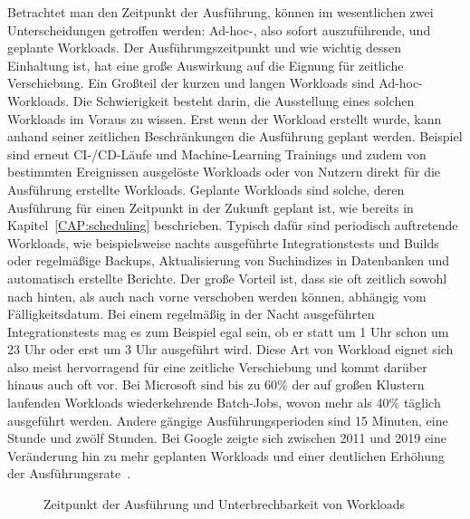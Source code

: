 Betrachtet man den Zeitpunkt der Ausführung, können im wesentlichen zwei Unterscheidungen getroffen werden:
Ad-hoc-, also sofort auszuführende, und geplante Workloads.
Der Ausführungszeitpunkt und wie wichtig dessen Einhaltung ist, hat eine große Auswirkung auf die Eignung für zeitliche Verschiebung.
Ein Großteil der kurzen und langen Workloads sind Ad-hoc-Workloads.
Die Schwierigkeit besteht darin, die Ausstellung eines solchen Workloads im Voraus zu wissen.
Erst wenn der Workload erstellt wurde, kann anhand seiner zeitlichen Beschränkungen die Ausführung geplant werden.
Beispiel sind erneut CI-/CD-Läufe und Machine-Learning Trainings und zudem von bestimmten Ereignissen ausgelöste Workloads oder von Nutzern direkt für die Ausführung erstellte Workloads.
Geplante Workloads sind solche, deren Ausführung für einen Zeitpunkt in der Zukunft geplant ist, wie bereits in Kapitel~\ref{CAP:scheduling} beschrieben.
Typisch dafür sind periodisch auftretende Workloads, wie beispielsweise nachts ausgeführte Integrationstests und Builds oder regelmäßige Backups, Aktualisierung von Suchindizes in Datenbanken und automatisch erstellte Berichte.
Der große Vorteil ist, dass sie oft zeitlich sowohl nach hinten, als auch nach vorne verschoben werden können, abhängig vom Fälligkeitsdatum.
Bei einem regelmäßig in der Nacht ausgeführten Integrationstests mag es zum Beispiel egal sein, ob er statt um 1 Uhr schon um 23 Uhr oder erst um 3 Uhr ausgeführt wird.
Diese Art von Workload eignet sich also meist hervorragend für eine zeitliche Verschiebung und kommt darüber hinaus auch oft vor.
Bei Microsoft sind bis zu 60\% der auf großen Klustern laufenden Workloads wiederkehrende Batch-Jobs, wovon mehr als 40\% täglich ausgeführt werden.
Andere gängige Ausführungsperioden sind 15 Minuten, eine Stunde und zwölf Stunden.
Bei Google zeigte sich zwischen 2011 und 2019 eine Veränderung hin zu mehr geplanten Workloads und einer deutlichen Erhöhung der Ausführungsrate~\cite{Wiesner.2021}.
\begin{figure}
 \centering
 \qquad
 \caption{Zeitpunkt der Ausführung und Unterbrechbarkeit von Workloads}%
 \label{FIG:workloads-execution-time-interruptibility}%
\end{figure}

